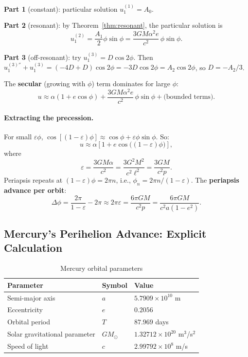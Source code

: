 \documentclass[12pt,a4paper]{article}
\theoremstyle{plain}
\theoremstyle{definition}
\theoremstyle{remark}
\newcommand{\leff}{\ell}  %
\begin{document}
\textbf{Part 1} (constant): particular solution $u_1^{(1)} = A_0$.

\textbf{Part 2} (resonant): by Theorem~\ref{thm:resonant}, the particular solution is
\[
  u_1^{(2)} = \frac{A_1}{2}\phi\sin\phi = \frac{3GM\alpha^2 e}{c^2}\,\phi\sin\phi.
\]

\textbf{Part 3} (off-resonant): try $u_1^{(3)}=D\cos 2\phi$. Then $u_1^{(3)''}+u_1^{(3)}=(-4D+D)\cos 2\phi=-3D\cos 2\phi = A_2\cos 2\phi$, so $D=-A_2/3$.

The \textbf{secular} (growing with $\phi$) term dominates for large $\phi$:
\[
  u \approx \alpha(1+e\cos\phi) + \frac{3GM\alpha^2 e}{c^2}\,\phi\sin\phi + \text{(bounded terms)}.
\]

\paragraph{Extracting the precession.} For small $\varepsilon\phi$, $\cos[(1-\varepsilon)\phi]\approx\cos\phi+\varepsilon\phi\sin\phi$. So:
\[
  u \approx \alpha\!\left[1 + e\cos\!\bigl((1-\varepsilon)\phi\bigr)\right],
\]
where
\[
  \varepsilon = \frac{3GM\alpha}{c^2} = \frac{3G^2M^2}{c^2\leff^2} = \frac{3GM}{c^2 p}.
\]
Periapsis repeats at $(1-\varepsilon)\phi = 2\pi n$, i.e., $\phi_n = 2\pi n/(1-\varepsilon)$. The \textbf{periapsis advance per orbit}:
\begin{equation}\label{eq:precession}
  \boxed{\Delta\phi = \frac{2\pi}{1-\varepsilon}-2\pi \approx 2\pi\varepsilon = \frac{6\pi GM}{c^2 p} = \frac{6\pi GM}{c^2 a(1-e^2)}.}
\end{equation}

\subsection{Mercury's Perihelion Advance: Explicit Calculation}

\begin{table}[h]
\centering
\caption{Mercury orbital parameters}
\begin{tabular}{lll}
  \toprule
  Parameter & Symbol & Value \\
  \midrule
  Semi-major axis & $a$ & $5.7909\times10^{10}$ m \\
  Eccentricity & $e$ & $0.2056$ \\
  Orbital period & $T$ & $87.969$ days \\
  Solar gravitational parameter & $GM_\odot$ & $1.32712\times10^{20}$ m$^3$/s$^2$ \\
  Speed of light & $c$ & $2.99792\times10^8$ m/s \\
  \bottomrule
\end{tabular}
\end{table}
\end{document}
